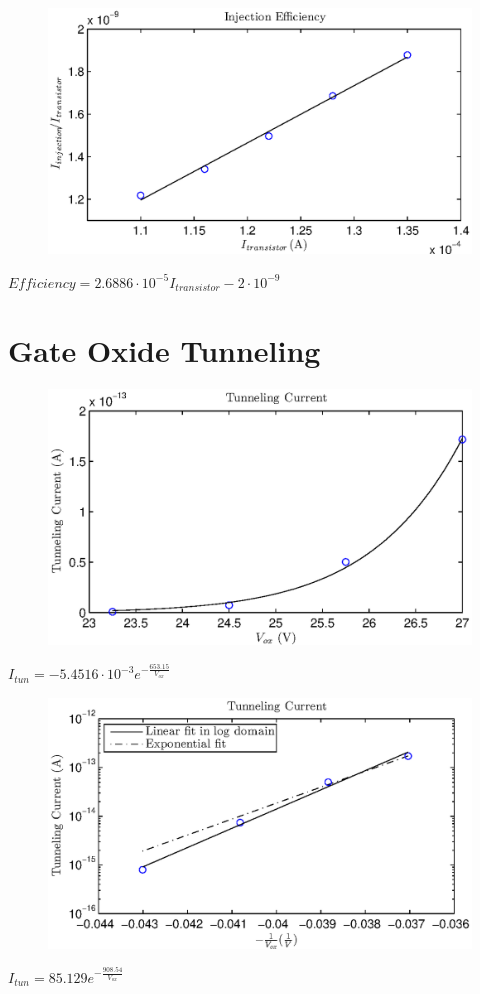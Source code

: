 \begin{figure}[!htb]
	\center
	\includegraphics{exp2.eps}
	\caption{}
	\label{fig:exp2}
\end{figure}

$Efficiency = 2.6886\cdot10^{-5} I_{transistor} -2\cdot10^{-9}$

\section{Gate Oxide Tunneling}

\begin{figure}[!htb]
	\center
	\includegraphics{exp3a.eps}
	\caption{}
	\label{fig:exp3a}
\end{figure}

$I_{tun}=-5.4516\cdot10^{-3} e^{-\frac{653.15}{V_{ox}}}$

\begin{figure}[!htb]
	\center
	\includegraphics{exp3b.eps}
	\caption{}
	\label{fig:exp3b}
\end{figure}

$I_{tun}=85.129 e^{-\frac{908.54}{V_{ox}}}$


